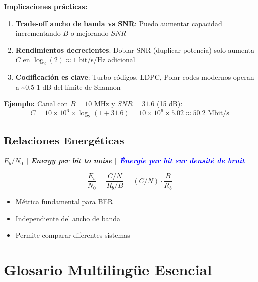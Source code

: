 \documentclass[a4paper,10pt]{article}
\begin{document}
\textbf{Implicaciones pr\'acticas:}
\begin{enumerate}
    \item \textbf{Trade-off ancho de banda vs SNR}: Puedo aumentar capacidad incrementando $B$ o mejorando $SNR$
    \item \textbf{Rendimientos decrecientes}: Doblar SNR (duplicar potencia) solo aumenta $C$ en $\log_2(2) \approx 1$ bit/s/Hz adicional
    \item \textbf{Codificaci\'on es clave}: Turbo c\'odigos, LDPC, Polar codes modernos operan a \textasciitilde{}0.5-1 dB del l\'imite de Shannon
\end{enumerate}

\textbf{Ejemplo:} Canal con $B=10$ MHz y $SNR=31.6$ (15 dB):
$$C = 10 \times 10^6 \times \log_2(1+31.6) = 10 \times 10^6 \times 5.02 \approx 50.2 \text{ Mbit/s}$$

\subsection{Relaciones Energéticas}

\textbf{$E_b/N_0$ | \textit{Energy per bit to noise} | \textcolor{blue}{\textit{\'Energie par bit sur densit\'e de bruit}}}

$$\frac{E_b}{N_0} = \frac{C/N}{R_b/B} = (C/N) \cdot \frac{B}{R_b}$$

\begin{itemize}[leftmargin=*]
    \item M\'etrica fundamental para BER
    \item Independiente del ancho de banda
    \item Permite comparar diferentes sistemas
\end{itemize}

\section{Glosario Multilingüe Esencial}
\end{document}
